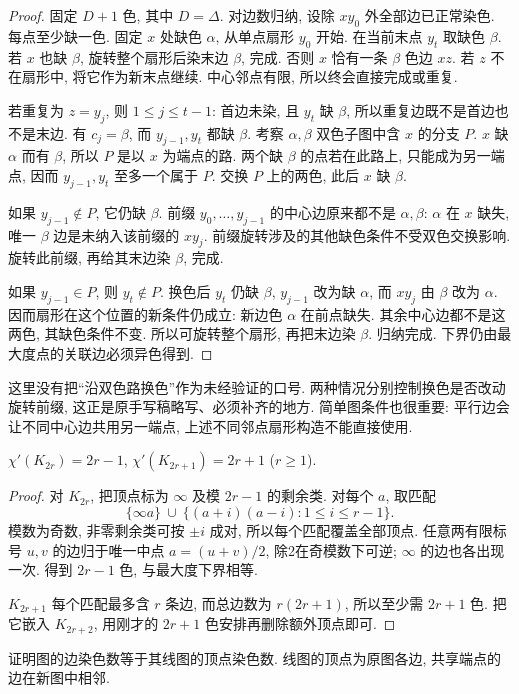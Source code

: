 \begin{proof}
固定 $D+1$ 色, 其中 $D=\Delta$. 对边数归纳, 设除 $xy_0$ 外全部边已正常染色. 每点至少缺一色. 固定 $x$ 处缺色 $\alpha$, 从单点扇形 $y_0$ 开始. 在当前末点 $y_t$ 取缺色 $\beta$. 若 $x$ 也缺 $\beta$, 旋转整个扇形后染末边 $\beta$, 完成. 否则 $x$ 恰有一条 $\beta$ 色边 $xz$. 若 $z$ 不在扇形中, 将它作为新末点继续. 中心邻点有限, 所以终会直接完成或重复.

若重复为 $z=y_j$, 则 $1\le j\le t-1$: 首边未染, 且 $y_t$ 缺 $\beta$, 所以重复边既不是首边也不是末边. 有 $c_j=\beta$, 而 $y_{j-1},y_t$ 都缺 $\beta$. 考察 $\alpha,\beta$ 双色子图中含 $x$ 的分支 $P$. $x$ 缺 $\alpha$ 而有 $\beta$, 所以 $P$ 是以 $x$ 为端点的路. 两个缺 $\beta$ 的点若在此路上, 只能成为另一端点, 因而 $y_{j-1},y_t$ 至多一个属于 $P$. 交换 $P$ 上的两色, 此后 $x$ 缺 $\beta$.

如果 $y_{j-1}\notin P$, 它仍缺 $\beta$. 前缀 $y_0,\ldots,y_{j-1}$ 的中心边原来都不是 $\alpha,\beta$: $\alpha$ 在 $x$ 缺失, 唯一 $\beta$ 边是未纳入该前缀的 $xy_j$. 前缀旋转涉及的其他缺色条件不受双色交换影响. 旋转此前缀, 再给其末边染 $\beta$, 完成.

如果 $y_{j-1}\in P$, 则 $y_t\notin P$. 换色后 $y_t$ 仍缺 $\beta$, $y_{j-1}$ 改为缺 $\alpha$, 而 $xy_j$ 由 $\beta$ 改为 $\alpha$. 因而扇形在这个位置的新条件仍成立: 新边色 $\alpha$ 在前点缺失. 其余中心边都不是这两色, 其缺色条件不变. 所以可旋转整个扇形, 再把末边染 $\beta$. 归纳完成. 下界仍由最大度点的关联边必须异色得到.
\end{proof}
这里没有把“沿双色路换色”作为未经验证的口号. 两种情况分别控制换色是否改动旋转前缀, 这正是原手写稿略写、必须补齐的地方. 简单图条件也很重要: 平行边会让不同中心边共用另一端点, 上述不同邻点扇形构造不能直接使用.
\begin{proposition}
$\chi'(K_{2r})=2r-1$, $\chi'(K_{2r+1})=2r+1$ ($r\ge1$).
\end{proposition}
\begin{proof}
对 $K_{2r}$, 把顶点标为 $\infty$ 及模 $2r-1$ 的剩余类. 对每个 $a$, 取匹配
\[
\{\infty a\}\ \cup\ \{(a+i)(a-i):1\le i\le r-1\}.
\]
模数为奇数, 非零剩余类可按 $\pm i$ 成对, 所以每个匹配覆盖全部顶点. 任意两有限标号 $u,v$ 的边归于唯一中点 $a=(u+v)/2$, 除2在奇模数下可逆; $\infty$ 的边也各出现一次. 得到 $2r-1$ 色, 与最大度下界相等.

$K_{2r+1}$ 每个匹配最多含 $r$ 条边, 而总边数为 $r(2r+1)$, 所以至少需 $2r+1$ 色. 把它嵌入 $K_{2r+2}$, 用刚才的 $2r+1$ 色安排再删除额外顶点即可.
\end{proof}
\begin{exercise}\label{ex:edge1}
证明图的边染色数等于其线图的顶点染色数. 线图的顶点为原图各边, 共享端点的边在新图中相邻.
\end{exercise}
